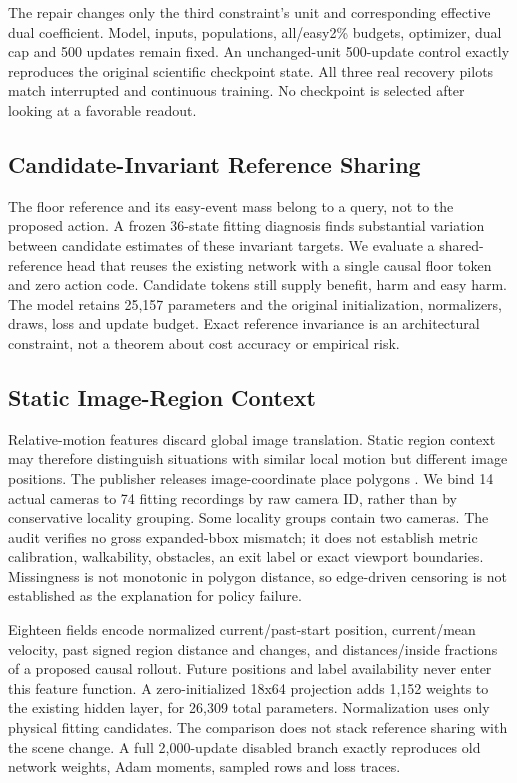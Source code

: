 \documentclass[10pt,twocolumn,letterpaper]{article}
\begin{document}
The repair changes only the third constraint's unit and corresponding effective
dual coefficient. Model, inputs, populations, all/easy2\% budgets, optimizer,
dual cap and 500 updates remain fixed. An unchanged-unit 500-update control exactly
reproduces the original scientific checkpoint state. All three real recovery
pilots match interrupted and continuous training. No checkpoint is selected
after looking at a favorable readout.

\subsection{Candidate-Invariant Reference Sharing}
The floor reference and its easy-event mass belong to a query, not to the proposed
action. A frozen 36-state fitting diagnosis finds substantial variation between
candidate estimates of these invariant targets. We evaluate a shared-reference
head that reuses the existing network with a single causal floor token and zero
action code. Candidate tokens still supply benefit, harm and easy harm. The model
retains 25,157 parameters and the original initialization, normalizers, draws, loss
and update budget. Exact reference invariance is an architectural constraint,
not a theorem about cost accuracy or empirical risk.

\subsection{Static Image-Region Context}
Relative-motion features discard global image translation. Static region context
may therefore distinguish situations with similar local motion but different
image positions. The publisher releases image-coordinate place polygons \cite{ref6}.
We bind 14 actual cameras to 74 fitting recordings by raw camera ID, rather than by
conservative locality grouping. Some locality groups contain two cameras.
The audit verifies no gross expanded-bbox mismatch; it does not establish metric
calibration, walkability, obstacles, an exit label or exact viewport boundaries.
Missingness is not monotonic in polygon distance, so edge-driven censoring is
not established as the explanation for policy failure.

Eighteen fields encode normalized current/past-start position, current/mean
velocity, past signed region distance and changes, and distances/inside fractions
of a proposed causal rollout. Future positions and label availability never
enter this feature function. A zero-initialized 18x64 projection adds 1,152 weights
to the existing hidden layer, for 26,309 total parameters. Normalization uses only
physical fitting candidates. The comparison does not stack reference sharing
with the scene change. A full 2,000-update disabled branch exactly reproduces
old network weights, Adam moments, sampled rows and loss traces.
\end{document}
